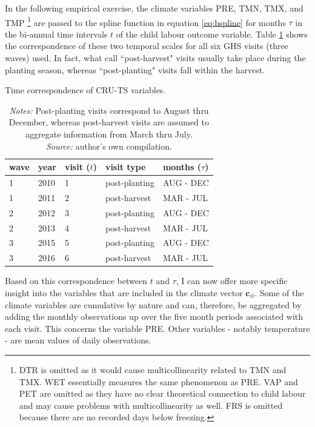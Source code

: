 \documentclass[a4paper,12pt]{article}
\theoremstyle{plain}
\theoremstyle{definition}
\theoremstyle{definition}
\theoremstyle{definition}
\theoremstyle{definition}
\begin{document}
In the following empirical exercise, the climate variables PRE, TMN, TMX, and TMP \footnote{DTR is omitted as it would cause multicollinearity related to TMN and TMX. WET essentially measures the same phenomenon as PRE. VAP and PET are omitted as they have no clear theoretical connection to child labour and may cause problems with multicollinearity as well. FRS is omitted because there are no recorded days below freezing.} are passed to the spline function in equation \ref{eq:bspline} for months $\tau$ in the bi-annual time intervals $t$ of the child labour outcome variable. Table \ref{tab:time_correspondence} shows the correspondence of these two temporal scales for all six GHS visits (three waves) used. In fact, what \citet{NBS2020} call ``post-harvest" visits usually take place during the planting season, whereas ``post-planting" visits fall within the harvest. 

\begin{table}[h]
    \singlespacing
    \centering
    \caption{Time correspondence of CRU-TS variables.}
    \begin{tabular}{|p{1.2cm}|p{1.2cm}|p{1.8cm}|p{3cm}|p{3cm}|}
    \hline
    \raggedright \textbf{wave} & \textbf{year} &\textbf{visit ($t$)} & \textbf{visit type}  & \textbf{months ($\tau$)}\\
    \hline
    1 & 2010 & 1 & post-planting & AUG - DEC\\
    1 & 2011 & 2 & post-harvest & MAR - JUL\\
    2 & 2012 & 3 & post-planting & AUG - DEC\\
    2 & 2013 & 4 & post-harvest & MAR - JUL\\
    3 & 2015 & 5 & post-planting & AUG - DEC\\
    3 & 2016 & 6 & post-harvest & MAR - JUL\\
    \hline
    \end{tabular}
    \caption*{\footnotesize{\textit{Notes:} Post-planting visits correspond to August thru December, whereas post-harvest visits are assumed to aggregate information from March thru July.\\ \textit{Source:} author's own compilation.}}
    \label{tab:time_correspondence}
\end{table}

Based on this correspondence between $t$ and $\tau$, I can now offer more specific insight into the variables that are included in the climate vector $\mathbf{c}_{it}$. Some of the climate variables are cumulative by nature and can, therefore, be aggregated by adding the monthly observations up over the five month periods associated with each visit. This concerns the variable PRE. Other variables - notably temperature - are mean values of daily observations.
\end{document}
